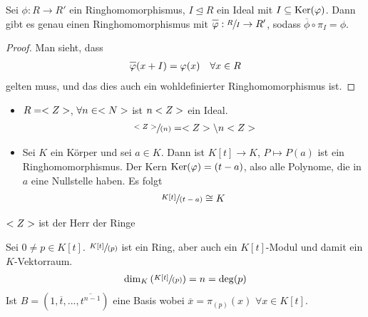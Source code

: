 \begin{proposition}
	Sei $\phi:R\to R'$ ein Ringhomomorphismus, $I\unlhd R$ ein Ideal mit $I\subseteq \operatorname{Ker}(\varphi)$. Dann gibt es genau einen Ringhomomorphismus mit $\overline{\phi}:\qraum{R}{I}\to R'$, sodass $\overline{\phi}\circ \pi_I=\phi$.
	\begin{center}
	\end{center}
\end{proposition}
\begin{proof}
	Man sieht, dass 
	\begin{align}
		\overline{\phi}(x+I)=\phi(x)\quad\forall x\in R\notag
	\end{align}
	gelten muss, und das dies auch ein wohldefinierter Ringhomomorphismus ist.
\end{proof}

\begin{example}
	\begin{itemize}
		\item $R=<Z>$, $\forall n\in<N>$ ist $n<Z>$ ein Ideal.
		\begin{align}
			\sfrac{<Z>}{(n)}=<Z>\backslash n<Z>\notag
		\end{align}
		\item Sei $K$ ein Körper und sei $a\in K$. Dann ist $K[t]\to K$, $P\mapsto P(a)$ ist ein Ringhomomorphismus. Der Kern $\operatorname{Ker}(\varphi)=(t-a)$, also alle Polynome, die in $a$ eine Nullstelle haben. Es folgt
		\begin{align}
			\sfrac{K[t]}{(t-a)}\cong K\notag
		\end{align}
	\end{itemize}
\end{example}

\smiley{} $<Z>$ ist der Herr der Ringe \smiley{}

\begin{example}
	Sei $0\neq p\in K[t]$. $\sfrac{K[t]}{(p)}$ ist ein Ring, aber auch ein $K[t]$-Modul und damit ein $K$-Vektorraum.
	\begin{align}
		\dim_K\left( \sfrac{K[t]}{(p)}\right) = n= \deg(p)\notag
	\end{align}
	Ist $B=(1,\overline{t},...,\overline{t^{n-1}})$ eine Basis wobei $\overline{x}=\pi_{(p)}(x)$ $\forall x\in K[t]$.
\end{example}